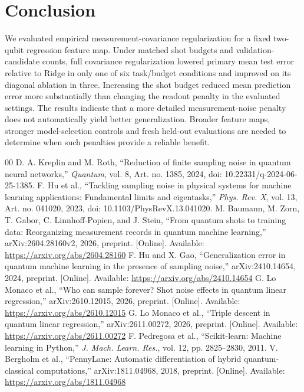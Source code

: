 \documentclass[conference]{IEEEtran}
\begin{document}
\section{Conclusion}
We evaluated empirical measurement-covariance regularization for a fixed two-qubit regression feature map. Under matched shot budgets and validation-candidate counts, full covariance regularization lowered primary mean test error relative to Ridge in only one of six task/budget conditions and improved on its diagonal ablation in three. Increasing the shot budget reduced mean prediction error more substantially than changing the readout penalty in the evaluated settings. The results indicate that a more detailed measurement-noise penalty does not automatically yield better generalization. Broader feature maps, stronger model-selection controls and fresh held-out evaluations are needed to determine when such penalties provide a reliable benefit.

\begin{thebibliography}{00}
 D. A. Kreplin and M. Roth, ``Reduction of finite sampling noise in quantum neural networks,'' \textit{Quantum}, vol. 8, Art. no. 1385, 2024, doi: 10.22331/q-2024-06-25-1385.
 F. Hu et al., ``Tackling sampling noise in physical systems for machine learning applications: Fundamental limits and eigentasks,'' \textit{Phys. Rev. X}, vol. 13, Art. no. 041020, 2023, doi: 10.1103/PhysRevX.13.041020.
 M. Baumann, M. Zorn, T. Gabor, C. Linnhoff-Popien, and J. Stein, ``From quantum shots to training data: Reorganizing measurement records in quantum machine learning,'' arXiv:2604.28160v2, 2026, preprint. [Online]. Available: \url{https://arxiv.org/abs/2604.28160}
 F. Hu and X. Gao, ``Generalization error in quantum machine learning in the presence of sampling noise,'' arXiv:2410.14654, 2024, preprint. [Online]. Available: \url{https://arxiv.org/abs/2410.14654}
 G. Lo Monaco et al., ``Who can sample forever? Shot noise effects in quantum linear regression,'' arXiv:2610.12015, 2026, preprint. [Online]. Available: \url{https://arxiv.org/abs/2610.12015}
 G. Lo Monaco et al., ``Triple descent in quantum linear regression,'' arXiv:2611.00272, 2026, preprint. [Online]. Available: \url{https://arxiv.org/abs/2611.00272}
 F. Pedregosa et al., ``Scikit-learn: Machine learning in Python,'' \textit{J. Mach. Learn. Res.}, vol. 12, pp. 2825--2830, 2011.
 V. Bergholm et al., ``PennyLane: Automatic differentiation of hybrid quantum-classical computations,'' arXiv:1811.04968, 2018, preprint. [Online]. Available: \url{https://arxiv.org/abs/1811.04968}
\end{thebibliography}
\end{document}
